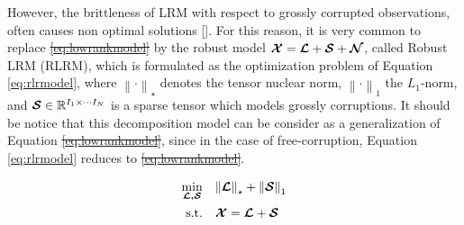 \documentclass[sensors,article,submit,moreauthors,pdftex]{Definitions/mdpi}
\newcommand{\mathten}[1]{\boldsymbol{\mathbf{\mathcal{\MakeUppercase{#1}}}}}
\providecommand{\DIFadd}[1]{{\protect\color{blue}\uwave{#1}}} %
\providecommand{\DIFdel}[1]{{\protect\color{red}\sout{#1}}}                      %
\providecommand{\DIFaddbegin}{} %
\providecommand{\DIFaddend}{} %
\providecommand{\DIFdelbegin}{} %
\providecommand{\DIFdelend}{} %
\begin{document}
\DIFaddend However, the brittleness of LRM with respect to grossly corrupted observations, often causes non optimal solutions []. For this reason, it is very common to replace \DIFdelbegin \DIFdel{\ref{eq:lowrankmodel} }\DIFdelend \DIFaddbegin \DIFadd{\ref{eq:lrmodel} }\DIFaddend by the robust model $\mathten{X} = \mathten{L} + \mathten{S} + \mathten{N}$, called Robust LRM (RLRM), which is formulated as the optimization problem of Equation \ref{eq:rlrmodel}, where $\left\lVert \cdot \right\rVert_\star$ denotes the tensor nuclear norm, $\left\lVert \cdot \right\rVert_1$ the $L_1$-norm, and $\mathten{S}\in\mathbb{R}^{I_1\times \cdots I_N}$ is a sparse tensor which models grossly corruptions. It should be notice that this decomposition model can be consider as a generalization of Equation \DIFdelbegin \DIFdel{\ref{eq:lowrankmodel}}\DIFdelend \DIFaddbegin \DIFadd{\ref{eq:lrmodel}}\DIFaddend , since in the case of free-corruption, Equation \ref{eq:rlrmodel} reduces to \DIFdelbegin \DIFdel{\ref{eq:lowrankmodel}}\DIFdelend \DIFaddbegin \DIFadd{\ref{eq:lrmodel}}\DIFaddend .

\begin{equation}
\begin{aligned}
\min_{\mathten{L,S}} \quad & {\left\lVert \mathten{L} \right\rVert_\star + \left\lVert\mathten{S}\right\rVert_1}\\
\textrm{s.t.} \quad & \mathten{X} = \mathten{L} + \mathten{S}
\end{aligned}
\label{eq:rlrmodel}
\end{equation}

\end{document}
